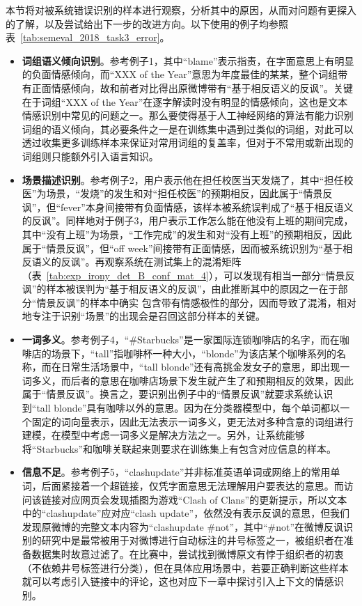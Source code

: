 本节将对被系统错误识别的样本进行观察，分析其中的原因，从而对问题有更探入的了解，以及尝试给出下一步的改进方向。以下使用的例子均参照表~\ref{tab:semeval_2018_task3_error}。

\begin{itemize}

\item {\bf 词组语义倾向识别}。参考例子1，其中“blame”表示指责，在字面意思上有明显的负面情感倾向，而“XXX of the Year”意思为年度最佳的某某，整个词组带有正面情感倾向，故和前者对比得出原微博带有“基于相反语义的反讽”。关键在于词组“XXX of the Year”在逐字解读时没有明显的情感倾向，这也是文本情感识别中常见的问题之一。那么要使得基于人工神经网络的算法有能力识别词组的语义倾向，其必要条件之一是在训练集中遇到过类似的词组，对此可以透过收集更多训练样本来保证对常用词组的复盖率，但对于不常用或新出现的词组则只能额外引入语言知识。

\item {\bf 场景描述识别}。参考例子2，用户表示他在担任校医当天发烧了，其中“担任校医”为场景，“发烧”的发生和对“担任校医”的预期相反，因此属于“情景反讽”，但“fever”本身间接带有负面情感，该样本被系统误判成了“基于相反语义的反讽”。同样地对于例子3，用户表示工作怎么能在他没有上班的期间完成，其中“没有上班”为场景，“工作完成”的发生和对“没有上班”的预期相反，因此属于“情景反讽”，但“off week”间接带有正面情感，因而被系统识别为“基于相反语义的反讽”。再观察系统在测试集上的混淆矩阵（表~\ref{tab:exp_irony_det_B_conf_mat_4}），可以发现有相当一部分“情景反讽”的样本被误判为“基于相反语义的反讽”，由此推断其中的原因之一在于部分“情景反讽”的样本中确实
包含带有情感极性的部分，因而导致了混淆，相对地专注于识别“场景”的出现会是召回这部分样本的关键。

\item {\bf 一词多义}。参考例子4，“\#Starbucks”是一家国际连锁咖啡店的名字，而在咖啡店的场景下，“tall”指咖啡杯一种大小，“blonde”为该店某个咖啡系列的名称，而在日常生活场景中，“tall blonde”还有高挑金发女子的意思，即出现一词多义，而后者的意思在咖啡店场景下发生就产生了和预期相反的效果，因此属于“情景反讽”。换言之，要识别出例子中的“情景反讽”就要求系统认识到“tall blonde”具有咖啡以外的意思。因为在分类器模型中，每个单词都以一个固定的词向量表示，因此无法表示一词多义，更无法对多种含意的词组进行建模，在模型中考虑一词多义是解决方法之一。另外，让系统能够将“Starbucks”和咖啡关联起来则要求在训练集上有包含对应信息的样本。

\item {\bf 信息不足}。参考例子5，“clashupdate”并非标准英语单词或网络上的常用单词，后面紧接着一个超链接，仅凭字面意思无法理解用户要表达的意思。而访问该链接对应网页会发现插图为游戏“Clash of Clans”的更新提示，所以文本中的“clashupdate”应对应“clash update”，依然没有表示反讽的意思，但我们发现原微博的完整文本内容为“clashupdate \#not”，其中“\#not”在微博反讽识别的研究中是最常被用于对微博进行自动标注的井号标签之一，被组织者在准备数据集时故意过滤了。在比赛中，尝试找到微博原文有悖于组织者的初衷（不依赖井号标签进行分类），但在具体应用场景中，若要正确判断这些样本就可以考虑引入链接中的评论，这也对应下一章中探讨引入上下文的情感识别。

\end{itemize}

